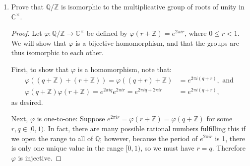 \documentclass{article}
\begin{document}
\begin{enumerate}[label=(\alph*), itemsep=0em]
\begin{proof}
            First, let $q + \mathbb{Z} \in \mathbb{Q}/\mathbb{Z}$. Since rational numbers are also real numbers, $q + \mathbb{Z}$ also lies in $\mathbb{R}/\mathbb{Z}$. From 14.b), it has finite order. Therefore it is an element of the torsion subgroup of $\mathbb{R}/\mathbb{Z}$.

            Next, let $x + \mathbb{Z}$ be an element of the torsion subgroup of $\mathbb{R}/\mathbb{Z}$. Suppose that $|x + \mathbb{Z}| = n < \infty$. Then we have:
            \begin{equation*}
                \underbrace{(x + \mathbb{Z}) + ... + (x + \mathbb{Z})}_{n \text{ times}} = \underbrace{(x + ... + x)}_{n \text{ times}} + \mathbb{Z} = nx + \mathbb{Z} = \mathbb{Z},
            \end{equation*}
            which implies that $nx$ is an integer. Suppose that $nx = m \in \mathbb{Z}$. Then $x = m/n$, and so we have $x \in \mathbb{Q}$, which implies that $x + \mathbb{Z} \in \mathbb{Q}/\mathbb{Z}$.

            Therefore, because inclusion in one implies inclusion in the other and vice-versa, these groups are equal.
          \end{proof}
    \item Prove that $\mathbb{Q}/\mathbb{Z}$ is isomorphic to the multiplicative group of roots of unity in $\mathbb{C}^\times$.
          \begin{proof}
            Let $\varphi: \mathbb{Q}/\mathbb{Z} \rightarrow \mathbb{C}^\times$ be defined by $\varphi(r + \mathbb{Z}) = e^{2 \pi i r}$, where $0 \leq r < 1$. We will show that $\varphi$ is a bijective homomorphism, and that the groups are thus isomorphic to each other.

            First, to show that $\varphi$ is a homomorphism, note that:
            \begin{align*}
                \varphi((q + \mathbb{Z}) + (r + \mathbb{Z})) = \varphi((q + r) + \mathbb{Z}) &= e^{2 \pi i (q + r)}, \text{ and } \\
                \varphi(q + \mathbb{Z}) \varphi(r + \mathbb{Z}) = e^{2 \pi i q} e^{2 \pi i r} = e^{2 \pi i q + 2 \pi i r} &= e^{2 \pi i (q + r)},
            \end{align*}
            as desired.

            Next, $\varphi$ is one-to-one: Suppose $e^{2 \pi i r} = \varphi(r + \mathbb{Z}) = \varphi(q + \mathbb{Z})$ for some $r, q \in [0,1)$. In fact, there are many possible rational numbers fulfilling this if we open the range to all of $\mathbb{Q}$; however, because the period of $e^{2 \pi i r}$ is 1, there is only one unique value in the range $[0, 1)$, so we must have $r = q$. Therefore $\varphi$ is injective.


\end{proof}
\end{enumerate}
\end{document}
